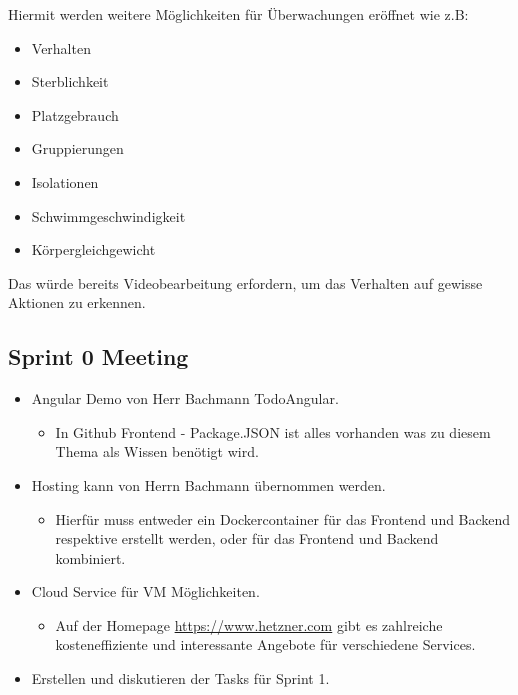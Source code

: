\documentclass[../main.tex]{subfiles}
\begin{document}
	\par \noindent
	Hiermit werden weitere Möglichkeiten für Überwachungen eröffnet wie z.B:
	
	\begin{itemize}
	 	\item Verhalten 
	 	\item Sterblichkeit
	 	\item Platzgebrauch
	 	\item Gruppierungen
	 	\item Isolationen
	 	\item Schwimmgeschwindigkeit
	 	\item Körpergleichgewicht
	\end{itemize}
\noindent
	Das würde bereits Videobearbeitung erfordern, um das Verhalten auf gewisse Aktionen zu erkennen. 
	\subsection{Sprint 0 Meeting}
	\begin{itemize}
		\item Angular Demo von  Herr Bachmann TodoAngular.
		\begin{itemize}
			\item In Github Frontend - Package.JSON ist alles vorhanden was zu diesem Thema als Wissen benötigt wird.
		\end{itemize}
		\item Hosting kann von Herrn Bachmann übernommen werden.
		\begin{itemize}
			\item Hierfür muss entweder ein Dockercontainer für das Frontend und Backend respektive erstellt werden, oder für das Frontend und Backend kombiniert.
		\end{itemize}
		\item Cloud Service für VM Möglichkeiten.
		\begin{itemize}
			\item Auf der Homepage \url{https://www.hetzner.com} gibt es zahlreiche kosteneffiziente und interessante Angebote für verschiedene Services.
		\end{itemize}
		\item Erstellen und diskutieren der Tasks für Sprint 1.
	\end{itemize}	
	
\end{document}
